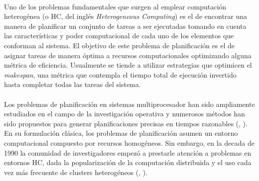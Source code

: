 \paragraph{}Uno de los problemas fundamentales que surgen al emplear computación heterogénea (o HC, del inglés \textit{Heterogeneous Computing}) es el de encontrar una manera de planificar un conjunto de tareas a ser ejecutadas tomando en cuenta las características y poder computacional de cada uno de los elementos que conforman al sistema. El objetivo de este problema de planificación es el de asignar tareas de manera óptima a recursos computacionales optimizando alguna métrica de eficiencia. Usualmente se tiende a utilizar estrategias que optimicen el \textit{makespan}, una métrica que contempla el tiempo total de ejecución invertido hasta completar todas las tareas del sistema.

\paragraph{}Los problemas de planificación en sistemas multiprocesador han sido ampliamente estudiados en el campo de la investigación operativa y numerosos métodos han sido propuestos para generar planificaciones precisas en tiempos razonables (\citet{bib-rewini-scheduling}, \citet{bib-leung-handbook}). En su formulación clásica, los problemas de planificación asumen un entorno computacional compuesto por recursos homogéneos. Sin embargo, en la decada de 1990 la comunidad de investigadores empezó a prestarle atención a problemas en entornos HC, dada la popularización de la computación distribuida y el uso cada vez más frecuente de clusters heterogéneos (\citet{bib-freund}, \citet{bib-eshaghian-heterogeneous}).

